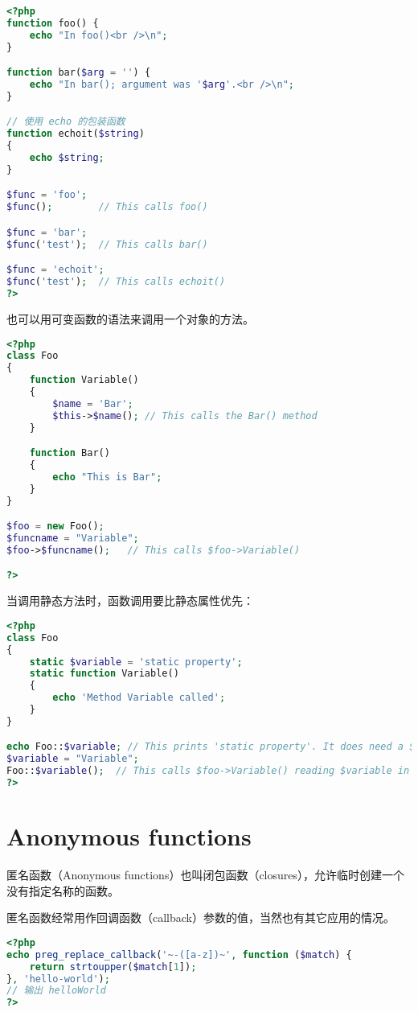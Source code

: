 \begin{lstlisting}[language=PHP]
<?php
function foo() {
    echo "In foo()<br />\n";
}

function bar($arg = '') {
    echo "In bar(); argument was '$arg'.<br />\n";
}

// 使用 echo 的包装函数
function echoit($string)
{
    echo $string;
}

$func = 'foo';
$func();        // This calls foo()

$func = 'bar';
$func('test');  // This calls bar()

$func = 'echoit';
$func('test');  // This calls echoit()
?>
\end{lstlisting}


也可以用可变函数的语法来调用一个对象的方法。

\begin{lstlisting}[language=PHP]
<?php
class Foo
{
    function Variable()
    {
        $name = 'Bar';
        $this->$name(); // This calls the Bar() method
    }

    function Bar()
    {
        echo "This is Bar";
    }
}

$foo = new Foo();
$funcname = "Variable";
$foo->$funcname();   // This calls $foo->Variable()

?>
\end{lstlisting}

当调用静态方法时，函数调用要比静态属性优先：

\begin{lstlisting}[language=PHP]
<?php
class Foo
{
    static $variable = 'static property';
    static function Variable()
    {
        echo 'Method Variable called';
    }
}

echo Foo::$variable; // This prints 'static property'. It does need a $variable in this scope.
$variable = "Variable";
Foo::$variable();  // This calls $foo->Variable() reading $variable in this scope.
?>
\end{lstlisting}


\chapter{Anonymous functions}

匿名函数（Anonymous functions）也叫闭包函数（closures），允许临时创建一个没有指定名称的函数。

匿名函数经常用作回调函数（callback）参数的值，当然也有其它应用的情况。


\begin{lstlisting}[language=PHP]
<?php
echo preg_replace_callback('~-([a-z])~', function ($match) {
    return strtoupper($match[1]);
}, 'hello-world');
// 输出 helloWorld
?>
\end{lstlisting}

